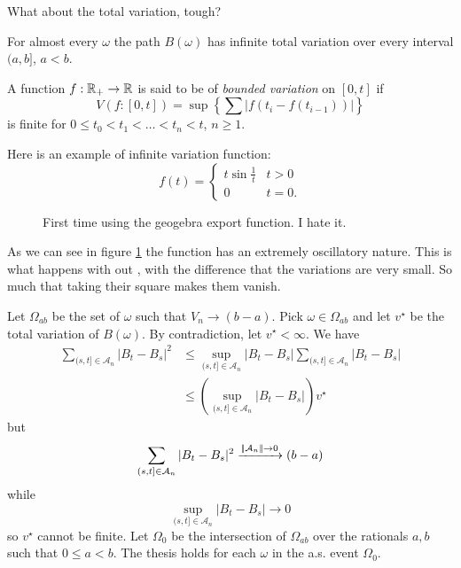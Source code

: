 \documentclass[12pt]{report}
\begin{document}
What about the total variation, tough?
\begin{proposition}
	For almost every $\omega$ the path $B(\omega)$ has infinite total variation over every interval $(a,b]$, $a<b$.
\end{proposition}
\begin{revise}
	A function $f:\mathbb{R}_{+}\to\mathbb{R}$ is said to be of \emph{bounded variation} on $[0,t]$ if $$V(f:[0,t])=\sup\left\{\sum|f(t_{i}-f(t_{i-1}))|\right\}$$ is finite for $0\leq t_{0}<t_{1}<\ldots<t_{n}<t$, $n\geq 1$.
\end{revise}
Here is an example of infinite variation function: 
\begin{equation*}
	f(t)=\begin{cases}
		t\sin\frac{1}{t}&t>0\\
		0&t=0.
	\end{cases}
\end{equation*}
\begin{figure}[h]
	\centering
	
	\caption{First time using the geogebra export function. I hate it.}
	\label{fig:codio}
\end{figure}
As we can see in figure \ref{fig:codio} the function has an extremely oscillatory nature. This is what happens with out \bwm, with the difference that the variations are very small. So much that taking their square makes them vanish.
\begin{fancyproof}
	Let $\Omega_{ab}$ be the set of $\omega$ such that $V_{n}\to(b-a)$. Pick $\omega\in\Omega_{ab}$ and let $v^{\star}$ be the total variation of $B(\omega)$. By contradiction, let $v^{\star}<\infty$. We have
	\begin{align*}
		\sum_{(s,t]\in\mathcal{A}_{n}}|B_{t}-B_{s}|^{2}&\leq\sup_{(s,t]\in\mathcal{A}_{n}}|B_{t}-B_{s}|\sum_{(s,t]\in\mathcal{A}_{n}}|B_{t}-B_{s}|\\
		&\leq\left(\sup_{(s,t]\in\mathcal{A}_{n}}|B_{t}-B_{s}|\right)v^{\star}
	\end{align*}
	but
	\begin{equation*}
		\sum_{(s,t]\in\mathcal{A}_{n}}|B_{t}-B_{s}|^{2}\xrightarrow{\left|\negthinspace\left|\mathcal{A}_{n}\right|\negthinspace\right|\to0}(b-a)
	\end{equation*}
	while 
	\begin{equation*}
		\sup_{(s,t]\in\mathcal{A}_{n}}|B_{t}-B_{s}|\to0
	\end{equation*}
	so $v^{\star}$ cannot be finite. Let $\Omega_{0}$ be the intersection of $\Omega_{ab}$ over the rationals $a,b$ such that $0\leq a<b$. The thesis holds for each $\omega$ in the a.s. event $\Omega_{0}$.
\end{fancyproof}
\end{document}
